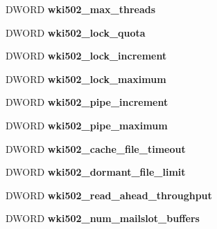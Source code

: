 \begin{DoxyCompactItemize}
\mbox{\label{struct___w_k_s_t_a___i_n_f_o__502_aeff45252e3961a515f32fdd70cb6da8e}} 
D\+W\+O\+RD {\bfseries wki502\+\_\+max\+\_\+threads}
\item 
\mbox{\label{struct___w_k_s_t_a___i_n_f_o__502_adea8f8c771e3e25ac03cbbe92d0e438e}} 
D\+W\+O\+RD {\bfseries wki502\+\_\+lock\+\_\+quota}
\item 
\mbox{\label{struct___w_k_s_t_a___i_n_f_o__502_acd252f0aaa356f0af8804add5e63b681}} 
D\+W\+O\+RD {\bfseries wki502\+\_\+lock\+\_\+increment}
\item 
\mbox{\label{struct___w_k_s_t_a___i_n_f_o__502_a2b9528b4d34fc98ac171d7684e6e7f1f}} 
D\+W\+O\+RD {\bfseries wki502\+\_\+lock\+\_\+maximum}
\item 
\mbox{\label{struct___w_k_s_t_a___i_n_f_o__502_a18a1697e42df8594724ef2a27d05586b}} 
D\+W\+O\+RD {\bfseries wki502\+\_\+pipe\+\_\+increment}
\item 
\mbox{\label{struct___w_k_s_t_a___i_n_f_o__502_ade4546bbcbd0d58cd3ada99762e8f1bd}} 
D\+W\+O\+RD {\bfseries wki502\+\_\+pipe\+\_\+maximum}
\item 
\mbox{\label{struct___w_k_s_t_a___i_n_f_o__502_a2e6208c6bbdf12ac12f1457b0e82483b}} 
D\+W\+O\+RD {\bfseries wki502\+\_\+cache\+\_\+file\+\_\+timeout}
\item 
\mbox{\label{struct___w_k_s_t_a___i_n_f_o__502_a01231014a5d8b5f1ab2166c02459b2f5}} 
D\+W\+O\+RD {\bfseries wki502\+\_\+dormant\+\_\+file\+\_\+limit}
\item 
\mbox{\label{struct___w_k_s_t_a___i_n_f_o__502_a6742c02e95d3d5aa2084bc45bd26e023}} 
D\+W\+O\+RD {\bfseries wki502\+\_\+read\+\_\+ahead\+\_\+throughput}
\item 
\mbox{\label{struct___w_k_s_t_a___i_n_f_o__502_a3c4a43cc07abfac4199050c5f3c1a51d}} 
D\+W\+O\+RD {\bfseries wki502\+\_\+num\+\_\+mailslot\+\_\+buffers}

\end{DoxyCompactItemize}

